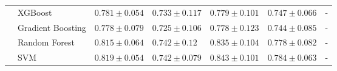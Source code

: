 \documentclass[12pt,a4paper]{standalone}
\begin{document}
\begin{tabular}{lllllll}
                                    & XGBoost           & $0.781 \pm 0.054$                             & $0.733 \pm 0.117$                             & $0.779 \pm 0.101$                             & $0.747 \pm 0.066$                             & - \\ \nopagebreak
                                    & Gradient Boosting & $0.778 \pm 0.079$                             & $0.725 \pm 0.106$                             & $0.778 \pm 0.123$                             & $0.744 \pm 0.085$                             & - \\ \nopagebreak
                                    & Random Forest     & $0.815 \pm 0.064$                             & \cellcolor{gray!50}$0.742 \pm 0.12$           & $0.835 \pm 0.104$                             & $0.778 \pm 0.082$                             & - \\ \nopagebreak
                                    & SVM               & \cellcolor{gray!50}$\mathbf{0.819 \pm 0.054}$ & \cellcolor{gray!50}$0.742 \pm 0.079$          & \cellcolor{gray!50}$0.843 \pm 0.101$          & \cellcolor{gray!50}$\mathbf{0.784 \pm 0.063}$ & - \\ \midrule
\end{tabular}
\end{document}
